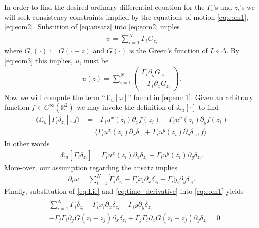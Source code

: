 \documentclass[12pt]{amsart}
\begin{document}
In order to find the desired ordinary differential equation for the $\Gamma_i$'s and $z_i$'s
we will seek consistency constraints implied by the equations of motion
\eqref{eq:eom1},\eqref{eq:eom2}. Substition of \eqref{eq:ansatz} into \eqref{eq:eom2} imples
\begin{align*}
  \psi = \sum_{i=1}^N \Gamma_i G_{z_i}
\end{align*}
where $G_{z}(\cdot) := G( \cdot - z)$ and  $G(\cdot)$ is the Green's function of $L \circ \Delta$.
By \eqref{eq:eom3} this implies, $u$, must be
\begin{align}
  u(z) =  \sum_{i=1}^N \begin{pmatrix}
    \Gamma_i \partial_y G_{z_i} \\
    -\Gamma_i \partial_x G_{z_i}
  \end{pmatrix}. \label{eq:u}
\end{align}
Now we will compute the term ``$\pounds_u[\omega]$'' found in \eqref{eq:eom1}.
Given an arbitrary function $f \in C^\infty(\mathbb{R}^2)$ we may invoke the definition of $\pounds_u[\cdot]$ to find
\begin{align*}
  \langle \pounds_u[ \Gamma_i \delta_{z_i} ] , f \rangle &= - \Gamma_i u^x(z_i) \partial_x f(z_i) - \Gamma_i u^y(z_i) \partial_y f(z_i) \\
 &= \langle \Gamma_i u^x(z_i) \partial_x \delta_{z_i} + \Gamma_i u^y(z_i) \partial_y \delta_{z_i} , f \rangle
\end{align*}
In other words
\begin{align}
  \pounds_u[\Gamma_i \delta_{z_i}] =  \Gamma_i u^x(z_i) \partial_x \delta_{z_i} + \Gamma_i u^y(z_i) \partial_y \delta_{z_i}. \label{eq:Lie}
\end{align}
More-over, our assumption regarding the ansatz implies
\begin{align}
  \partial_t \omega = \sum_{i=1}^N \dot{\Gamma}_i \delta_{z_i} - \Gamma_i \dot{x}_i \partial_x \delta_{z_i} - \Gamma_i \dot{y}_i \partial_y \delta_{z_i}. \label{eq:time_derivative}
\end{align}
Finally, substitution of \eqref{eq:Lie} and \eqref{eq:time_derivative} into \eqref{eq:eom1} yields
\begin{align}
  \begin{split}
  & \sum_{i=1}^N \dot{\Gamma_i} \delta_{z_i} - \Gamma_i \dot{x}_i \partial_x \delta_{z_i}
  - \Gamma_i \dot{y} \partial_y \delta_{z_i} \\
  &- \Gamma_j \Gamma_i \partial_yG(z_i - z_j) \partial_x \delta_{z_i} +
  \Gamma_j \Gamma_i \partial_x G(z_i-z_j) \partial_y \delta_{z_i}= 0 
  \end{split}
  \label{eq:eom4}
\end{align}
\end{document}
